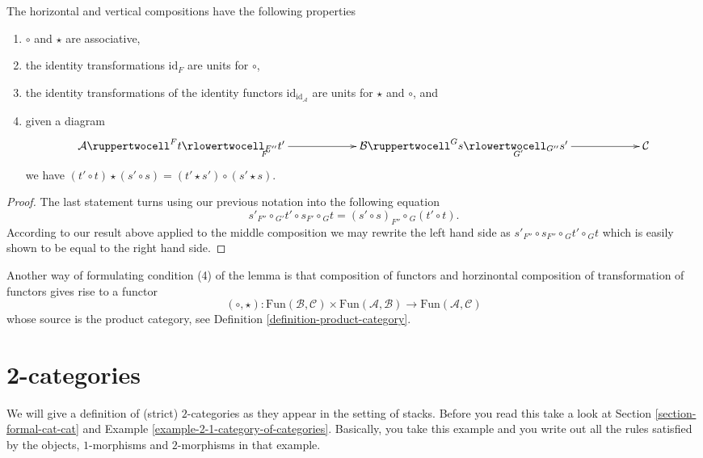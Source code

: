 \begin{lemma}
\label{lemma-properties-2-cat-cats}
The horizontal and vertical compositions have the following
properties
\begin{enumerate}
\item $\circ$ and $\star$ are associative,
\item the identity transformations $\text{id}_F$ 
are units for $\circ$,
\item the identity transformations of the identity functors
$\text{id}_{\text{id}_{\mathcal{A}}}$
are units for $\star$ and $\circ$, and
\item given a diagram
$$
\xymatrixcolsep{5pc}
\xymatrix{
\mathcal{A}
\ruppertwocell^F{t}
\ar[r]_(.3){F'}
\rlowertwocell_{F''}{t'}
&
\mathcal{B}
\ruppertwocell^G{s}
\ar[r]_(.3){G'}
\rlowertwocell_{G''}{s'}
&
\mathcal{C}
}
$$
we have $ (t' \circ t) \star (s' \circ s) = (t' \star s') \circ
(s' \star s)$.
\end{enumerate}
\end{lemma}

\begin{proof}
The last statement turns using our previous notation into the following
equation
$$
s'_{F''}
\circ
{}_{G'}t' 
\circ
s_{F'}
\circ
{}_Gt 
=
(s' \circ s)_{F''}
\circ
{}_G(t' \circ t).
$$
According to our result above applied to the middle composition
we may rewrite the left hand side as
$
s'_{F''}
\circ
s_{F''} 
\circ
{}_Gt'
\circ
{}_Gt 
$
which is easily shown to be equal to the right hand side.
\end{proof}

\noindent
Another way of formulating condition (4) of the lemma is
that composition of functors and horzinontal composition
of transformation of functors gives rise to a functor
$$
(\circ, \star) :
\text{Fun}(\mathcal{B}, \mathcal{C})
\times 
\text{Fun}(\mathcal{A}, \mathcal{B})
\longrightarrow
\text{Fun}(\mathcal{A}, \mathcal{C})
$$
whose source is the product category,
see Definition \ref{definition-product-category}.

\section{2-categories}
\label{section-2-categories}

\noindent
We will give a definition of (strict) $2$-categories as they appear
in the setting of stacks. Before you read this take a look at
Section \ref{section-formal-cat-cat} and Example
\ref{example-2-1-category-of-categories}. Basically, you take this example
and you write out all the rules satisfied by the objects, $1$-morphisms
and $2$-morphisms in that example.

